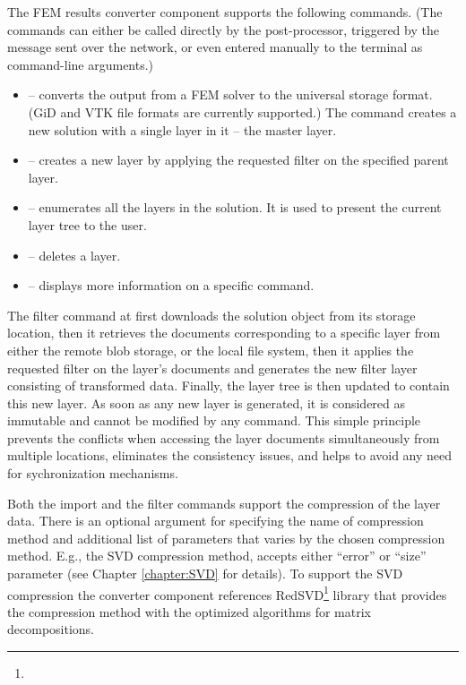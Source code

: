 The FEM results converter component supports the following commands. (The commands can either be called directly by the post-processor, triggered by the message sent over the network, or even entered manually to the terminal as command-line arguments.)

\begin{itemize}
    \item {} -- converts the output from a FEM solver to the universal storage format. (GiD and VTK file formats are currently supported.) The command creates a new solution with a single layer in it -- the master layer.
    \item {} -- creates a new layer by applying the requested filter on the specified parent layer.
    \item {} -- enumerates all the layers in the solution. It is used to present the current layer tree to the user.
    \item {} -- deletes a layer.
    \item {} -- displays more information on a specific command.
\end{itemize}

The filter command at first downloads the solution object from its storage location, then it retrieves the documents corresponding to a specific layer from either the remote blob storage, or the local file system, then it applies the requested filter on the layer's documents and generates the new filter layer consisting of transformed data. Finally, the layer tree is then updated to contain this new layer. As soon as any new layer is generated, it is considered as immutable and cannot be modified by any command. This simple principle prevents the conflicts when accessing the layer documents simultaneously from multiple locations, eliminates the consistency issues, and helps to avoid any need for sychronization mechanisms.

Both the import and the filter commands support the compression of the layer data. There is an optional argument for specifying the name of compression method and additional list of parameters that varies by the chosen compression method. E.g., the SVD compression method, accepts either ``error'' or ``size'' parameter (see Chapter \ref{chapter:SVD} for details). To support the SVD compression the converter component references RedSVD\footnote{} library that provides the compression method with the optimized algorithms for matrix decompositions.

